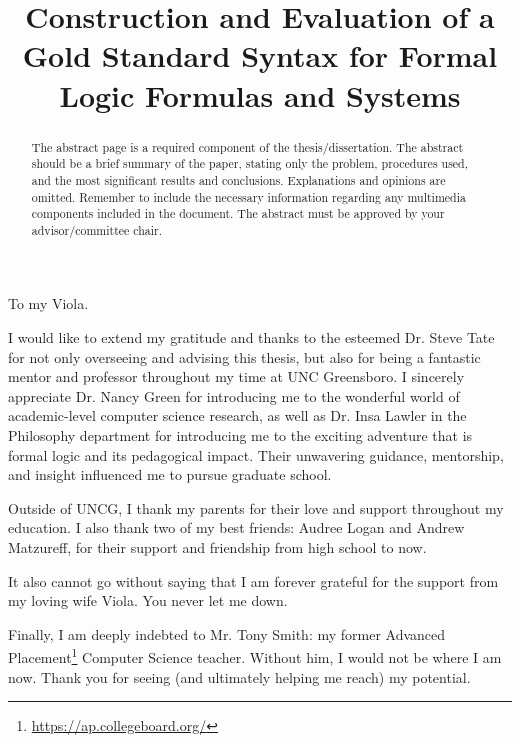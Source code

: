 \documentclass[ms]{uncgdissertationexp2}
\title{Construction and Evaluation of a Gold Standard Syntax for Formal Logic Formulas and Systems}
\theoremstyle{plain}
\theoremstyle{definition}
\theoremstyle{remark}
\begin{document}
\frontmatter      %

\begin{abstract}
	The abstract page is a required component of the thesis/dissertation.
	The abstract should be a brief summary of the paper, stating only the
	problem, procedures used, and the most significant results and
	conclusions. Explanations and opinions are omitted. Remember to
	include the necessary information regarding any multimedia components
	included in the document. The abstract must be approved by your
	advisor/committee chair. 
\end{abstract}

\maketitlepage

\makecopyrightpage

\begin{dedication}
	To my Viola.
\end{dedication}

\makeapprovalpage

\begin{acknowledgments}
	I would like to extend my gratitude and thanks to the esteemed Dr. Steve Tate for not only overseeing and advising this thesis, but also for being a fantastic mentor and professor throughout my time at UNC Greensboro. I sincerely appreciate Dr. Nancy Green for introducing me to the wonderful world of academic-level computer science research, as well as Dr. Insa Lawler in the Philosophy department for introducing me to the exciting adventure that is formal logic and its pedagogical impact. Their unwavering guidance, mentorship, and insight influenced me to pursue graduate school.
	
	Outside of UNCG, I thank my parents for their love and support throughout my education. I also thank two of my best friends: Audree Logan and Andrew Matzureff, for their support and friendship from high school to now.
	
	It also cannot go without saying that I am forever grateful for the support from my loving wife Viola. You never let me down.
	
	Finally, I am deeply indebted to Mr. Tony Smith: my former Advanced Placement\footnote{\url{https://ap.collegeboard.org/}} Computer Science teacher. Without him, I would not be where I am now. Thank you for seeing (and ultimately helping me reach) my potential.
\end{acknowledgments}
\end{document}
